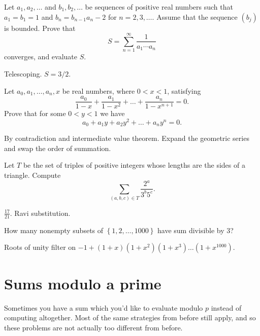 \documentclass[11pt]{scrartcl}
\begin{document}
\begin{problem}
	[Putnam 2011]
	Let $a_1,a_2,\dots$ and $b_1,b_2,\dots$ be sequences of positive
	real numbers such that $a_1 = b_1 = 1$ and $b_n = b_{n-1} a_n - 2$ for
	$n=2,3,\dots$. Assume that the sequence $(b_j)$ is bounded. Prove that
	\[
	S = \sum_{n=1}^\infty \frac{1}{a_1 \cdots a_n}
	\]
	converges, and evaluate $S$.
	\begin{hint}
		Telescoping. $S = 3/2$.
	\end{hint}
\end{problem}
\begin{problem}
	[Putnam 2013]
	Let $a_0, a_1, \dots, a_n, x$ be real numbers, where $0 < x < 1$, satisfying
	\[ \frac{a_0}{1-x} + \frac{a_1}{1-x^2} + \dots + \frac{a_n}{1-x^{n+1}} = 0. \]
	Prove that for some $0 < y < 1$ we have
	\[ a_0 + a_1y + a_2y^2 + \dots + a_ny^n = 0. \]
	\begin{hint}
		By contradiction and intermediate value theorem.
		Expand the geometric series and swap the order of summation.
	\end{hint}
\end{problem}
\begin{problem} %
	[Putnam 2015]
	Let $T$ be the set of triples of positive integers
	whose lengths are the sides of a triangle.
	Compute \[ \sum_{(a,b,c) \in T} \frac{2^a}{3^b5^c}. \]
	\begin{hint}
		$\frac{17}{21}$. Ravi substitution.
	\end{hint}
\end{problem}

\begin{problem} %
	How many nonempty subsets of $\left\{ 1,2,\dots,1000 \right\}$
	have sum divisible by $3$?
	\begin{hint}
		Roots of unity filter on
		$-1+(1+x)(1+x^2)(1+x^3)\dots(1+x^{1000})$.
	\end{hint}
\end{problem}

\section{Sums modulo a prime}
Sometimes you have a sum which you'd like to evaluate modulo $p$ instead
of computing altogether. Most of the same strategies from before still apply,
and so these problems are not actually too different from before.
\end{document}

